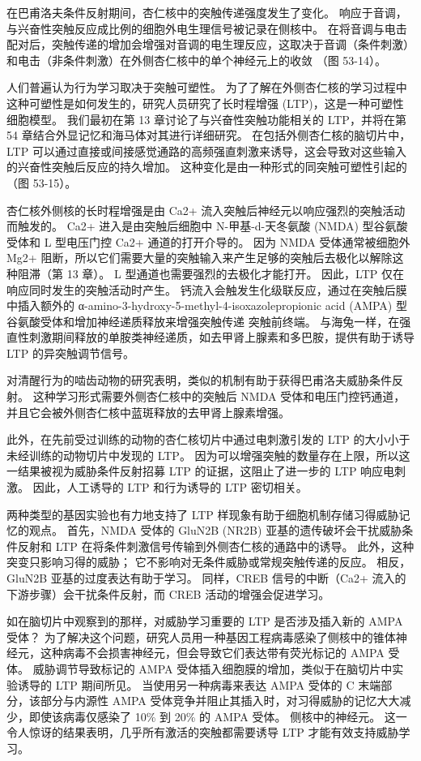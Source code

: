 在巴甫洛夫条件反射期间，杏仁核中的突触传递强度发生了变化。 响应于音调，与兴奋性突触反应成比例的细胞外电生理信号被记录在侧核中。 在将音调与电击配对后，突触传递的增加会增强对音调的电生理反应，这取决于音调（条件刺激）和电击（非条件刺激）在外侧杏仁核中的单个神经元上的收敛 （图 53-14）。

人们普遍认为行为学习取决于突触可塑性。 为了了解在外侧杏仁核的学习过程中这种可塑性是如何发生的，研究人员研究了长时程增强 (LTP)，这是一种可塑性细胞模型。 我们最初在第 13 章讨论了与兴奋性突触功能相关的 LTP，并将在第 54 章结合外显记忆和海马体对其进行详细研究。 在包括外侧杏仁核的脑切片中，LTP 可以通过直接或间接感觉通路的高频强直刺激来诱导，这会导致对这些输入的兴奋性突触后反应的持久增加。 这种变化是由一种形式的同突触可塑性引起的（图 53-15）。

杏仁核外侧核的长时程增强是由 Ca2+ 流入突触后神经元以响应强烈的突触活动而触发的。 Ca2+ 进入是由突触后细胞中 N-甲基-d-天冬氨酸 (NMDA) 型谷氨酸受体和 L 型电压门控 Ca2+ 通道的打开介导的。 因为 NMDA 受体通常被细胞外 Mg2+ 阻断，所以它们需要大量的突触输入来产生足够的突触后去极化以解除这种阻滞（第 13 章）。 L 型通道也需要强烈的去极化才能打开。 因此，LTP 仅在响应同时发生的突触活动时产生。 钙流入会触发生化级联反应，通过在突触后膜中插入额外的 α-amino-3-hydroxy-5-methyl-4-isoxazolepropionic acid (AMPA) 型谷氨酸受体和增加神经递质释放来增强突触传递 突触前终端。 与海兔一样，在强直性刺激期间释放的单胺类神经递质，如去甲肾上腺素和多巴胺，提供有助于诱导 LTP 的异突触调节信号。

对清醒行为的啮齿动物的研究表明，类似的机制有助于获得巴甫洛夫威胁条件反射。 这种学习形式需要外侧杏仁核中的突触后 NMDA 受体和电压门控钙通道，并且它会被外侧杏仁核中蓝斑释放的去甲肾上腺素增强。

此外，在先前受过训练的动物的杏仁核切片中通过电刺激引发的 LTP 的大小小于未经训练的动物切片中发现的 LTP。 因为可以增强突触的数量存在上限，所以这一结果被视为威胁条件反射招募 LTP 的证据，这阻止了进一步的 LTP 响应电刺激。 因此，人工诱导的 LTP 和行为诱导的 LTP 密切相关。

两种类型的基因实验也有力地支持了 LTP 样现象有助于细胞机制存储习得威胁记忆的观点。 首先，NMDA 受体的 GluN2B (NR2B) 亚基的遗传破坏会干扰威胁条件反射和 LTP 在将条件刺激信号传输到外侧杏仁核的通路中的诱导。 此外，这种突变只影响习得的威胁； 它不影响对无条件威胁或常规突触传递的反应。 相反，GluN2B 亚基的过度表达有助于学习。 同样，CREB 信号的中断（Ca2+ 流入的下游步骤）会干扰条件反射，而 CREB 活动的增强会促进学习。

如在脑切片中观察到的那样，对威胁学习重要的 LTP 是否涉及插入新的 AMPA 受体？ 为了解决这个问题，研究人员用一种基因工程病毒感染了侧核中的锥体神经元，这种病毒不会损害神经元，但会导致它们表达带有荧光标记的 AMPA 受体。 威胁调节导致标记的 AMPA 受体插入细胞膜的增加，类似于在脑切片中实验诱导的 LTP 期间所见。 当使用另一种病毒来表达 AMPA 受体的 C 末端部分，该部分与内源性 AMPA 受体竞争并阻止其插入时，对习得威胁的记忆大大减少，即使该病毒仅感染了 10\% 到 20\% 的 AMPA 受体。 侧核中的神经元。 这一令人惊讶的结果表明，几乎所有激活的突触都需要诱导 LTP 才能有效支持威胁学习。

